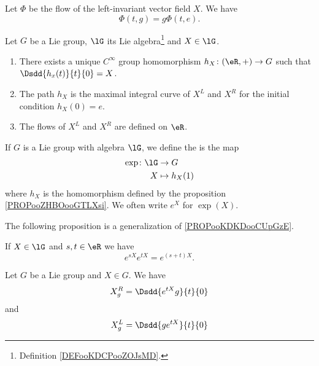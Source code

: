 \begin{proposition} \label{PROPooUXFQooIwimav}
    Let \( \Phi\) be the flow of the left-invariant vector field \( X\). We have
    \begin{equation}
        \Phi(t,g)=g\Phi(t,e).
    \end{equation}
\end{proposition}

\begin{proposition}     \label{PROPooZHBOooGTLXsi}
    Let \( G\) be a Lie group, \( \lG\) its Lie algebra\footnote{Definition \ref{DEFooKDCPooZOJsMD}.} and \( X\in\lG\). 
    \begin{enumerate}
        \item
            There exists a unique \(  C^{\infty}\) group homomorphism \( h_X\colon (\eR,+)\to G\) such that \( \Dsdd{ h_x(t) }{t}{0}=X\).
        \item
            The path \( h_X\) is the maximal integral curve of \( X^L\) and \( X^R\) for the initial condition \( h_X(0)=e\).
        \item
            The flows of \( X^L\) and \( X^R\) are defined on \( \eR\).
    \end{enumerate}
\end{proposition}

\begin{definition}
    If \( G\) is a Lie group with algebra \( \lG\), we define the  is the map
    \begin{equation}
        \begin{aligned}
            \exp\colon \lG&\to G \\
            X&\mapsto h_X(1) 
        \end{aligned}
    \end{equation}
    where \( h_X\) is the homomorphism defined by the proposition \ref{PROPooZHBOooGTLXsi}. We often write \(  e^{X} \) for \( \exp(X)\).
\end{definition}


The following proposition is a generalization of \ref{PROPooKDKDooCUpGzE}.
\begin{proposition}     \label{PROPooNRVJooEDCpOI}
    If \( X\in \lG\) and \( s,t\in \eR\) we have
    \begin{equation}
        e^{sX} e^{tX}= e^{(s+t)X}.
    \end{equation}
\end{proposition}

\begin{lemma}       \label{LEMooLMTZooCvunSl}
    Let \( G\) be a Lie group and \( X\in G\). We have
    \begin{equation}        \label{EQooNBENooPXLENs}
        X^R_g=\Dsdd{  e^{tX}g }{t}{0}
    \end{equation}
    and
    \begin{equation}
        X^L_g=\Dsdd{  ge^{tX} }{t}{0}
    \end{equation}
\end{lemma}

